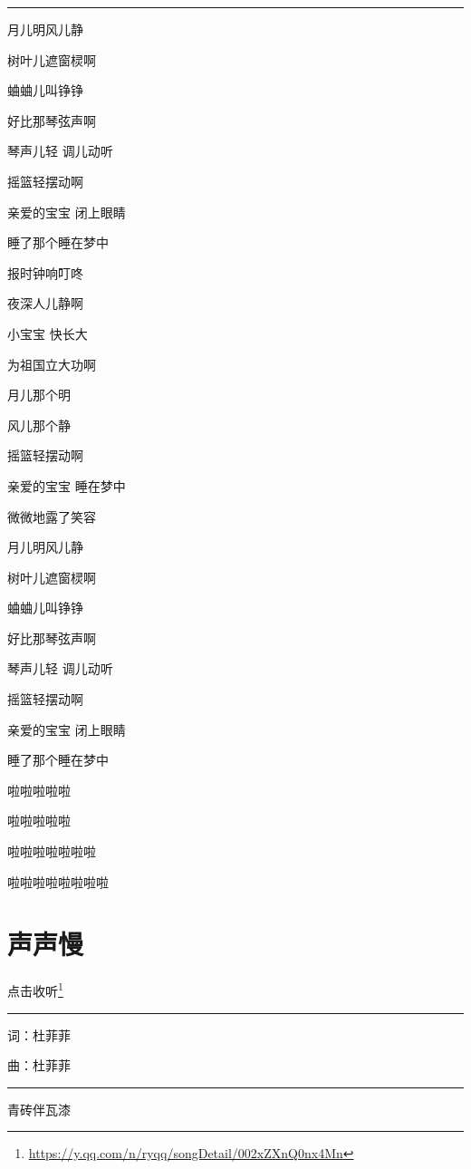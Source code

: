 \documentclass[]{ctexbook}
\renewcommand{\href}[2]{#2\footnote{\url{#1}}}
\begin{document}
\begin{center}\rule{0.5\linewidth}{0.5pt}\end{center}

月儿明风儿静

树叶儿遮窗棂啊

蛐蛐儿叫铮铮

好比那琴弦声啊

琴声儿轻 调儿动听

摇篮轻摆动啊

亲爱的宝宝 闭上眼睛

睡了那个睡在梦中

报时钟响叮咚

夜深人儿静啊

小宝宝 快长大

为祖国立大功啊

月儿那个明

风儿那个静

摇篮轻摆动啊

亲爱的宝宝 睡在梦中

微微地露了笑容

月儿明风儿静

树叶儿遮窗棂啊

蛐蛐儿叫铮铮

好比那琴弦声啊

琴声儿轻 调儿动听

摇篮轻摆动啊

亲爱的宝宝 闭上眼睛

睡了那个睡在梦中

啦啦啦啦啦

啦啦啦啦啦

啦啦啦啦啦啦啦

啦啦啦啦啦啦啦啦

\section*{声声慢}\label{say-slowly}


\href{https://y.qq.com/n/ryqq/songDetail/002xZXnQ0nx4Mn}{点击收听}

\begin{center}\rule{0.5\linewidth}{0.5pt}\end{center}

词：杜菲菲

曲：杜菲菲

\begin{center}\rule{0.5\linewidth}{0.5pt}\end{center}

青砖伴瓦漆
\end{document}
